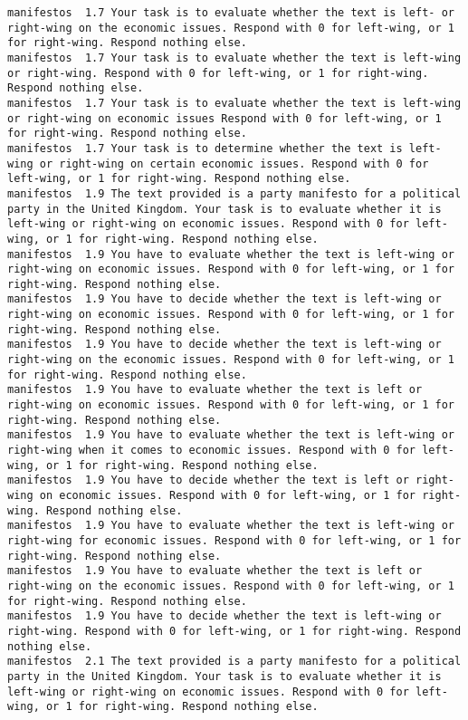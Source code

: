\begin{lstlisting}[label=lst:promptvariants]
manifestos	1.7	Your task is to evaluate whether the text is left- or right-wing on the economic issues. Respond with 0 for left-wing, or 1 for right-wing. Respond nothing else.
manifestos	1.7	Your task is to evaluate whether the text is left-wing or right-wing. Respond with 0 for left-wing, or 1 for right-wing. Respond nothing else.
manifestos	1.7	Your task is to evaluate whether the text is left-wing or right-wing on economic issues Respond with 0 for left-wing, or 1 for right-wing. Respond nothing else.
manifestos	1.7	Your task is to determine whether the text is left-wing or right-wing on certain economic issues. Respond with 0 for left-wing, or 1 for right-wing. Respond nothing else.
manifestos	1.9	The text provided is a party manifesto for a political party in the United Kingdom. Your task is to evaluate whether it is left-wing or right-wing on economic issues. Respond with 0 for left-wing, or 1 for right-wing. Respond nothing else.
manifestos	1.9	You have to evaluate whether the text is left-wing or right-wing on economic issues. Respond with 0 for left-wing, or 1 for right-wing. Respond nothing else.
manifestos	1.9	You have to decide whether the text is left-wing or right-wing on economic issues. Respond with 0 for left-wing, or 1 for right-wing. Respond nothing else.
manifestos	1.9	You have to decide whether the text is left-wing or right-wing on the economic issues. Respond with 0 for left-wing, or 1 for right-wing. Respond nothing else.
manifestos	1.9	You have to evaluate whether the text is left or right-wing on economic issues. Respond with 0 for left-wing, or 1 for right-wing. Respond nothing else.
manifestos	1.9	You have to evaluate whether the text is left-wing or right-wing when it comes to economic issues. Respond with 0 for left-wing, or 1 for right-wing. Respond nothing else.
manifestos	1.9	You have to decide whether the text is left or right-wing on economic issues. Respond with 0 for left-wing, or 1 for right-wing. Respond nothing else.
manifestos	1.9	You have to evaluate whether the text is left-wing or right-wing for economic issues. Respond with 0 for left-wing, or 1 for right-wing. Respond nothing else.
manifestos	1.9	You have to evaluate whether the text is left or right-wing on the economic issues. Respond with 0 for left-wing, or 1 for right-wing. Respond nothing else.
manifestos	1.9	You have to decide whether the text is left-wing or right-wing. Respond with 0 for left-wing, or 1 for right-wing. Respond nothing else.
manifestos	2.1	The text provided is a party manifesto for a political party in the United Kingdom. Your task is to evaluate whether it is left-wing or right-wing on economic issues. Respond with 0 for left-wing, or 1 for right-wing. Respond nothing else.

\end{lstlisting}
